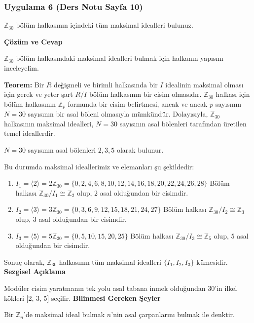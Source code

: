 \documentclass[11pt, a4paper]{article}
\newenvironment{cozum}{
    \vspace{0.5cm}
    \noindent\textcolor{green!60!black}{\faCheckCircle\enspace \textbf{\Large Çözüm ve Cevap}}\par\vspace{0.2cm}
}{}
\newenvironment{sezgisel}{
    \vspace{0.5cm}
    \noindent\textcolor{orange!80!black}{\faLightbulb\enspace \textbf{\Large Sezgisel Açıklama}}\par\vspace{0.2cm}
    \itshape
}{}
\newenvironment{bilgi}{
    \vspace{0.5cm}
    \noindent\textcolor{red!70!black}{\faExclamationTriangle\enspace \textbf{\Large Bilinmesi Gereken Şeyler}}\par\vspace{0.2cm}
}{}
\begin{document}
\subsubsection{Uygulama 6 (Ders Notu Sayfa 10)}
\begin{sorubox}
$\mathbb{Z}_{30}$ bölüm halkasının içindeki tüm maksimal idealleri bulunuz.
\end{sorubox}
\begin{cozum}
$\mathbb{Z}_{30}$ bölüm halkasındaki maksimal idealleri bulmak için halkanın yapısını inceleyelim.

\textbf{Teorem:} Bir $R$ değişmeli ve birimli halkasında bir $I$ idealinin maksimal olması için gerek ve yeter şart $R/I$ bölüm halkasının bir cisim olmasıdır. $\mathbb{Z}_{30}$ halkası için bölüm halkasının $\mathbb{Z}_p$ formunda bir cisim belirtmesi, ancak ve ancak $p$ sayısının $N = 30$ sayısının bir asal böleni olmasıyla mümkündür. Dolayısıyla, $\mathbb{Z}_{30}$ halkasının maksimal idealleri, $N = 30$ sayısının asal bölenleri tarafından üretilen temel ideallerdir.

$N = 30$ sayısının asal bölenleri $2, 3, 5$ olarak bulunur.

Bu durumda maksimal ideallerimiz ve elemanları şu şekildedir:
\begin{enumerate}
    \item $I_{1} = \langle 2 \rangle = 2\mathbb{Z}_{30} = \{0, 2, 4, 6, 8, 10, 12, 14, 16, 18, 20, 22, 24, 26, 28\}$
    Bölüm halkası $\mathbb{Z}_{30} / I_{1} \cong \mathbb{Z}_{2}$ olup, $2$ asal olduğundan bir cisimdir.
    \item $I_{2} = \langle 3 \rangle = 3\mathbb{Z}_{30} = \{0, 3, 6, 9, 12, 15, 18, 21, 24, 27\}$
    Bölüm halkası $\mathbb{Z}_{30} / I_{2} \cong \mathbb{Z}_{3}$ olup, $3$ asal olduğundan bir cisimdir.
    \item $I_{3} = \langle 5 \rangle = 5\mathbb{Z}_{30} = \{0, 5, 10, 15, 20, 25\}$
    Bölüm halkası $\mathbb{Z}_{30} / I_{3} \cong \mathbb{Z}_{5}$ olup, $5$ asal olduğundan bir cisimdir.
\end{enumerate}

Sonuç olarak, $\mathbb{Z}_{30}$ halkasının tüm maksimal idealleri $\{I_1, I_2, I_3\}$ kümesidir.
\end{cozum}
\begin{sezgisel}
Modüler cisim yaratmanın tek yolu asal tabana inmek olduğundan 30'in ilkel kökleri [2, 3, 5] seçilir.
\end{sezgisel}
\begin{bilgi}
Bir $\mathbb{Z}_n$'de maksimal ideal bulmak $n$'nin asal çarpanlarını bulmak ile denktir.
\end{bilgi}
\end{document}
